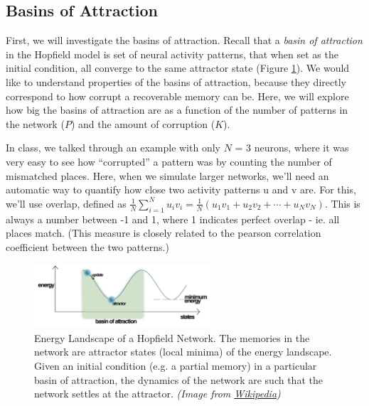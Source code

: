 \documentclass[letterpaper,11pt]{article}
\begin{document}
\subsection{Basins of Attraction}
First, we will investigate the basins of attraction. Recall that a \textit{basin of attraction} in the Hopfield model is set of neural activity patterns, that when set as the initial condition, all converge to the same attractor state (Figure \ref{fig:energy}). We would like to understand properties of the basins of attraction, because they directly correspond to how corrupt a recoverable memory can be. Here, we will explore how big the basins of attraction are as a function of the number of patterns in the network ($P$) and the amount of corruption ($K$).

In class, we talked through an example with only $N$ = 3 neurons, where it was very easy to
see how ``corrupted'' a pattern was by counting the number of mismatched places. Here, when we
simulate larger networks, we'll need an automatic way to quantify how close two activity patterns u
and v are. For this, we'll use overlap, defined as $\frac{1}{N} \sum_{i=1}^N u_i v_i = \frac{1}{N} (u_1 v_1 + u_2 v_2 + \cdots + u_N v_N)$. This is always a number between -1 and 1, where 1 indicates perfect overlap - ie. all places match. (This measure is closely related to the pearson correlation coefficient between the two patterns.)

\begin{figure}[h!]
  \begin{center}
    \includegraphics[width=0.6\textwidth]{energy.png}
    \caption{Energy Landscape of a Hopfield Network. The memories in the network are attractor states (local minima) of the energy landscape. Given an initial condition (e.g. a partial memory) in a particular basin of attraction, the dynamics of the network are such that the network settles at the attractor. \textit{(Image from \href{http://www.wikiwand.com/en/Hopfield\_network}{Wikipedia})}}
    \label{fig:energy}
  \end{center}
\end{figure}
\end{document}
